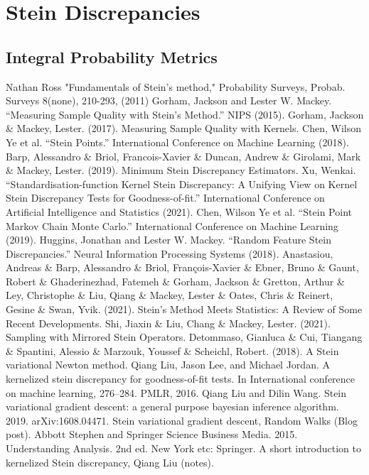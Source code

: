 \documentclass[12pt]{article}
\begin{document}
\section{Stein Discrepancies}
\subsection{Integral Probability Metrics}


\begin{thebibliography}{20}
 Nathan Ross "Fundamentals of Stein’s method," Probability Surveys, Probab. Surveys 8(none), 210-293, (2011)
 Gorham, Jackson and Lester W. Mackey. “Measuring Sample Quality with Stein's Method.” NIPS (2015).
 Gorham, Jackson \& Mackey, Lester. (2017). Measuring Sample Quality with Kernels. 
 Chen, Wilson Ye et al. “Stein Points.” International Conference on Machine Learning (2018).
 Barp, Alessandro \& Briol, Francois-Xavier \& Duncan, Andrew \& Girolami, Mark \& Mackey, Lester. (2019). Minimum Stein Discrepancy Estimators. 
 Xu, Wenkai. “Standardisation-function Kernel Stein Discrepancy: A Unifying View on Kernel Stein Discrepancy Tests for Goodness-of-fit.” International Conference on Artificial Intelligence and Statistics (2021).
 Chen, Wilson Ye et al. “Stein Point Markov Chain Monte Carlo.” International Conference on Machine Learning (2019).
 Huggins, Jonathan and Lester W. Mackey. “Random Feature Stein Discrepancies.” Neural Information Processing Systems (2018).
 Anastasiou, Andreas \& Barp, Alessandro \& Briol, François-Xavier \& Ebner, Bruno \& Gaunt, Robert \& Ghaderinezhad, Fatemeh \& Gorham, Jackson \& Gretton, Arthur \& Ley, Christophe \& Liu, Qiang \& Mackey, Lester \& Oates, Chris \& Reinert, Gesine \& Swan, Yvik. (2021). Stein's Method Meets Statistics: A Review of Some Recent Developments. 
 Shi, Jiaxin \& Liu, Chang \& Mackey, Lester. (2021). Sampling with Mirrored Stein Operators. 
 Detommaso, Gianluca \& Cui, Tiangang \& Spantini, Alessio \& Marzouk, Youssef \& Scheichl, Robert. (2018). A Stein variational Newton method. 
 Qiang Liu, Jason Lee, and Michael Jordan. A kernelized stein discrepancy for goodness-of-fit tests. In International conference on machine learning, 276–284. PMLR, 2016.
 Qiang Liu and Dilin Wang. Stein variational gradient descent: a general purpose bayesian inference algorithm. 2019. arXiv:1608.04471.
 Stein variational gradient descent, Random Walks (Blog post).
 Abbott Stephen and Springer Science Business Media. 2015. Understanding Analysis. 2nd ed. New York etc: Springer.
 A short introduction to kernelized Stein discrepancy, Qiang Liu (notes). 
\end{thebibliography}
\end{document}
